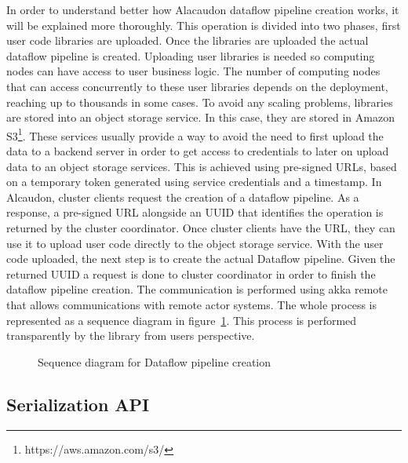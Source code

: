 In order to understand better how Alacaudon dataflow pipeline creation works, it
will be explained more thoroughly. This operation is divided into two phases,
first user code libraries are uploaded. Once the libraries are uploaded the
actual dataflow pipeline is created. Uploading user libraries is needed so
computing nodes can have access to user business logic. The number of computing nodes that
can access concurrently to these user libraries depends on the deployment,
reaching up to thousands in some cases. To avoid any scaling problems, libraries
are stored into an object storage service. In this case, they are stored in
Amazon S3\footnote{https://aws.amazon.com/s3/}. These services usually provide a
way to avoid the need to first upload the data to a backend server in order to
get access to credentials to later on upload data to an object storage services.
This is achieved using pre-signed URLs, based on a temporary token generated
using service credentials and a timestamp. In Alcaudon, cluster clients
request the creation of a dataflow pipeline. As a response, a pre-signed URL
alongside an UUID that identifies the operation is returned by the cluster
coordinator. Once cluster clients have the URL, they can use it to upload user
code directly to the object storage service. With the user code uploaded, the
next step is to create the actual Dataflow pipeline. Given the returned UUID a
request is done to cluster coordinator in order to finish the dataflow pipeline
creation. The communication is performed using akka remote that allows
communications with remote actor systems. The whole process is represented as a
sequence diagram in figure~\ref{fig:pipelinecreation}. This process is performed
transparently by the library from users perspective.

\begin{figure}[!h]
  \centering
  \scalebox{0.6}{
    
  }
\caption{Sequence diagram for Dataflow pipeline creation}
\label{fig:pipelinecreation}
\end{figure}

\subsection{Serialization API}

